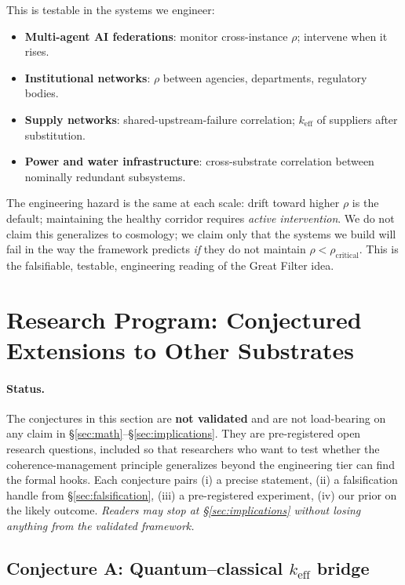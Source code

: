 \documentclass[11pt,a4paper]{article}
\begin{document}
This is testable in the systems we engineer:
\begin{itemize}
  \item \textbf{Multi-agent AI federations}: monitor cross-instance $\rho$; intervene when it rises.
  \item \textbf{Institutional networks}: $\rho$ between agencies, departments, regulatory bodies.
  \item \textbf{Supply networks}: shared-upstream-failure correlation; $k_{\text{eff}}$ of suppliers after substitution.
  \item \textbf{Power and water infrastructure}: cross-substrate correlation between nominally redundant subsystems.
\end{itemize}

The engineering hazard is the same at each scale: drift toward higher $\rho$ is the default; maintaining the healthy corridor requires \emph{active intervention}. We do not claim this generalizes to cosmology; we claim only that the systems we build will fail in the way the framework predicts \emph{if} they do not maintain $\rho < \rho_{\text{critical}}$. This is the falsifiable, testable, engineering reading of the Great Filter idea.

\section{Research Program: Conjectured Extensions to Other Substrates}
\label{sec:research-program}

\paragraph{Status.} The conjectures in this section are \textbf{not validated} and are not load-bearing on any claim in \S\ref{sec:math}--\S\ref{sec:implications}. They are pre-registered open research questions, included so that researchers who want to test whether the coherence-management principle generalizes beyond the engineering tier can find the formal hooks. Each conjecture pairs (i) a precise statement, (ii) a falsification handle from \S\ref{sec:falsification}, (iii) a pre-registered experiment, (iv) our prior on the likely outcome. \emph{Readers may stop at \S\ref{sec:implications} without losing anything from the validated framework.}

\subsection{Conjecture A: Quantum--classical $k_{\text{eff}}$ bridge}
\label{sec:conjecture-quantum}
\end{document}
